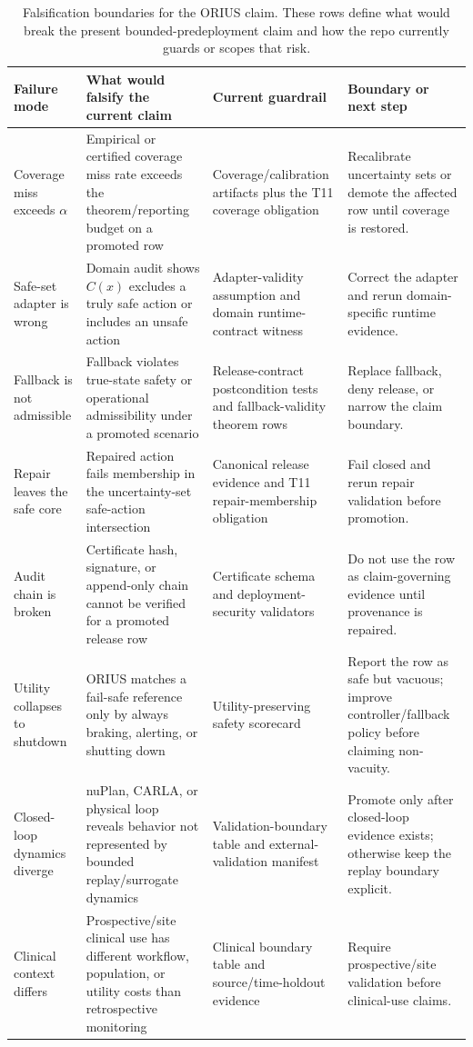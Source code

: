 \begin{table}[t]
\centering
\caption{Falsification boundaries for the ORIUS claim. These rows define what would break the present bounded-predeployment claim and how the repo currently guards or scopes that risk.}
\label{tab:orius-failure-falsification}
\footnotesize
\renewcommand{\arraystretch}{1.10}
\begin{tabularx}{\textwidth}{p{} p{} p{} X}
\toprule
\textbf{Failure mode} & \textbf{What would falsify the current claim} & \textbf{Current guardrail} & \textbf{Boundary or next step} \\
\midrule
Coverage miss exceeds $\alpha$ & Empirical or certified coverage miss rate exceeds the theorem/reporting budget on a promoted row & Coverage/calibration artifacts plus the T11 coverage obligation & Recalibrate uncertainty sets or demote the affected row until coverage is restored. \\
Safe-set adapter is wrong & Domain audit shows $C(x)$ excludes a truly safe action or includes an unsafe action & Adapter-validity assumption and domain runtime-contract witness & Correct the adapter and rerun domain-specific runtime evidence. \\
Fallback is not admissible & Fallback violates true-state safety or operational admissibility under a promoted scenario & Release-contract postcondition tests and fallback-validity theorem rows & Replace fallback, deny release, or narrow the claim boundary. \\
Repair leaves the safe core & Repaired action fails membership in the uncertainty-set safe-action intersection & Canonical release evidence and T11 repair-membership obligation & Fail closed and rerun repair validation before promotion. \\
Audit chain is broken & Certificate hash, signature, or append-only chain cannot be verified for a promoted release row & Certificate schema and deployment-security validators & Do not use the row as claim-governing evidence until provenance is repaired. \\
Utility collapses to shutdown & ORIUS matches a fail-safe reference only by always braking, alerting, or shutting down & Utility-preserving safety scorecard & Report the row as safe but vacuous; improve controller/fallback policy before claiming non-vacuity. \\
Closed-loop dynamics diverge & nuPlan, CARLA, or physical loop reveals behavior not represented by bounded replay/surrogate dynamics & Validation-boundary table and external-validation manifest & Promote only after closed-loop evidence exists; otherwise keep the replay boundary explicit. \\
Clinical context differs & Prospective/site clinical use has different workflow, population, or utility costs than retrospective monitoring & Clinical boundary table and source/time-holdout evidence & Require prospective/site validation before clinical-use claims. \\
\bottomrule
\end{tabularx}
\end{table}
